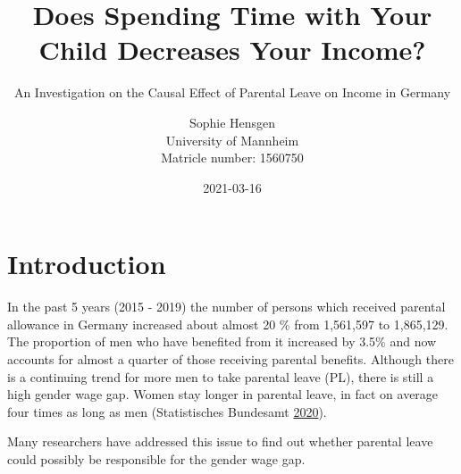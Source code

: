 \documentclass[
  11pt,
]{article}
\title{\vspace{1cm}Does Spending Time with Your Child Decreases Your Income?\vspace{0.5cm}\\}
\subtitle{An Investigation on the Causal Effect of Parental Leave on Income in Germany \vspace{0.5cm}}
\author{Sophie Hensgen\\
University of Mannheim\\
Matricle number: 1560750}
\date{2021-03-16\\}
\begin{document}
\maketitle

\hypertarget{introduction}{%
\section{Introduction}\label{introduction}}

In the past 5 years (2015 - 2019) the number of persons which received parental allowance in Germany increased about almost 20 \% from 1,561,597 to 1,865,129. The proportion of men who have benefited from it increased by 3.5\% and now accounts for almost a quarter of those receiving parental benefits. Although there is a continuing trend for more men to take parental leave (PL), there is still a high gender wage gap. Women stay longer in parental leave, in fact on average four times as long as men (Statistisches Bundesamt \protect\hyperlink{ref-statistisches_bundesamt_zeitreihe_2020}{2020}).

Many researchers have addressed this issue to find out whether parental leave could possibly be responsible for the gender wage gap.
\end{document}
